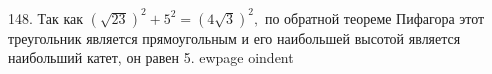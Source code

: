 148. Так как $(\sqrt{23})^2+5^2=(4\sqrt{3})^2,$ по обратной теореме Пифагора этот треугольник является прямоугольным и его наибольшей высотой является наибольший катет, он равен 5.
ewpage
oindent
